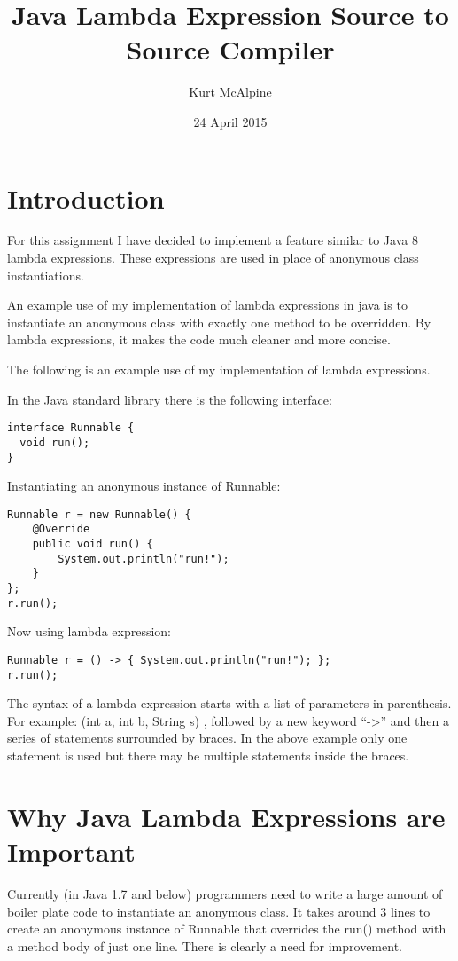 \documentclass[twocolumn,notitlepage]{report}
\begin{document}
\title{Java Lambda Expression Source to Source Compiler}
\author{Kurt McAlpine}
\date{24 April 2015}
\maketitle

\section*{Introduction}
For this assignment I have decided to implement a feature similar to Java 8
lambda expressions. These expressions are used in place of anonymous class
instantiations.

An example use of my implementation of lambda expressions in java is to
instantiate an anonymous class with exactly one method to be overridden. By
lambda expressions, it makes the code much cleaner and more
concise.\cite{website:love-and-hate-for-java-8}

The following is an example use of my implementation of lambda expressions.

In the Java standard library there is the following interface:
\begin{lstlisting}
interface Runnable {
  void run();
}
\end{lstlisting}

Instantiating an anonymous instance of Runnable:
\begin{lstlisting}
Runnable r = new Runnable() {
	@Override
	public void run() {
		System.out.println("run!");
	}
};
r.run();
\end{lstlisting}
Now using lambda expression:
\begin{lstlisting}
Runnable r = () -> { System.out.println("run!"); };    	
r.run();
\end{lstlisting}

The syntax of a lambda expression starts with a list of parameters in
parenthesis. For example: {\ttfamily(int a, int b, String s)} , followed by a
new keyword ``{\ttfamily->}'' and then a series of statements surrounded by
braces. In the above example only one statement is used but there may be
multiple statements inside the braces.

\section*{Why Java Lambda Expressions are Important}
Currently (in Java 1.7 and below) programmers need to write a large amount of
boiler plate code to instantiate an anonymous class. It takes around 3 lines to
create an anonymous instance of Runnable that overrides the run() method with a
method body of just one line. There is clearly a need for improvement.
\end{document}
